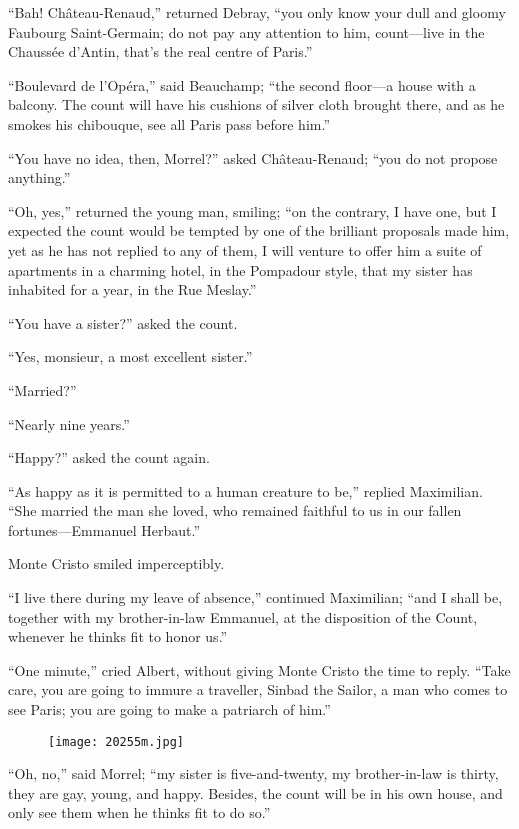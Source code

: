 “Bah! Château-Renaud,” returned Debray, “you only know your dull and
gloomy Faubourg Saint-Germain; do not pay any attention to him,
count—live in the Chaussée d’Antin, that’s the real centre of Paris.”

“Boulevard de l’Opéra,” said Beauchamp; “the second floor—a house with
a balcony. The count will have his cushions of silver cloth brought
there, and as he smokes his chibouque, see all Paris pass before him.”

“You have no idea, then, Morrel?” asked Château-Renaud; “you do not
propose anything.”

“Oh, yes,” returned the young man, smiling; “on the contrary, I have
one, but I expected the count would be tempted by one of the brilliant
proposals made him, yet as he has not replied to any of them, I will
venture to offer him a suite of apartments in a charming hotel, in the
Pompadour style, that my sister has inhabited for a year, in the Rue
Meslay.”

“You have a sister?” asked the count.

“Yes, monsieur, a most excellent sister.”

“Married?”

“Nearly nine years.”

“Happy?” asked the count again.

“As happy as it is permitted to a human creature to be,” replied
Maximilian. “She married the man she loved, who remained faithful to us
in our fallen fortunes—Emmanuel Herbaut.”

Monte Cristo smiled imperceptibly.

“I live there during my leave of absence,” continued Maximilian; “and I
shall be, together with my brother-in-law Emmanuel, at the disposition
of the Count, whenever he thinks fit to honor us.”

“One minute,” cried Albert, without giving Monte Cristo the time to
reply. “Take care, you are going to immure a traveller, Sinbad the
Sailor, a man who comes to see Paris; you are going to make a patriarch
of him.”

\begin{figure}[ht]
\texttt{[image: 20255m.jpg]}
\end{figure}

“Oh, no,” said Morrel; “my sister is five-and-twenty, my brother-in-law
is thirty, they are gay, young, and happy. Besides, the count will be
in his own house, and only see them when he thinks fit to do so.”

